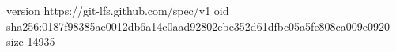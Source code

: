 version https://git-lfs.github.com/spec/v1
oid sha256:0187f98385ae0012db6a14c0aad92802ebe352d61dfbc05a5fe808ca009e0920
size 14935
